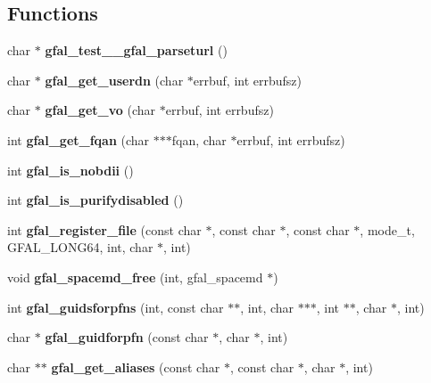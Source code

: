 \subsection*{Functions}
\begin{CompactItemize}
\item 
char $\ast$ \textbf{gfal\_\-test\_\-\_\-gfal\_\-parseturl} ()\label{group__internal__group_g9282bb70dffe20af2db91d05418ac9c5}

\item 
char $\ast$ \textbf{gfal\_\-get\_\-userdn} (char $\ast$errbuf, int errbufsz)\label{group__internal__group_g6bd6336b0fee1ff32ad6bc5ef3d96068}

\item 
char $\ast$ \textbf{gfal\_\-get\_\-vo} (char $\ast$errbuf, int errbufsz)\label{group__internal__group_g1d7294ee456d16c8b1bf40f97ffb5081}

\item 
int \textbf{gfal\_\-get\_\-fqan} (char $\ast$$\ast$$\ast$fqan, char $\ast$errbuf, int errbufsz)\label{group__internal__group_g54b4e29078838583c8022630ef5a2ed3}

\item 
int \textbf{gfal\_\-is\_\-nobdii} ()\label{group__internal__group_g0d2a0557bdb571ccb85c6ab5c05ae56f}

\item 
int \textbf{gfal\_\-is\_\-purifydisabled} ()\label{group__internal__group_g3a35f0e6f616c5108f95cfffd557db77}

\item 
int \textbf{gfal\_\-register\_\-file} (const char $\ast$, const char $\ast$, const char $\ast$, mode\_\-t, GFAL\_\-LONG64, int, char $\ast$, int)\label{group__internal__group_gdb09f20d086253b45c5d2896be95b4a9}

\item 
void \textbf{gfal\_\-spacemd\_\-free} (int, gfal\_\-spacemd $\ast$)\label{group__internal__group_gb22308fb1cfbade81dddfcf4bedf86da}

\item 
int \textbf{gfal\_\-guidsforpfns} (int, const char $\ast$$\ast$, int, char $\ast$$\ast$$\ast$, int $\ast$$\ast$, char $\ast$, int)\label{group__internal__group_g72f2d9fb6a55816f243a4c57c5369fe5}

\item 
char $\ast$ \textbf{gfal\_\-guidforpfn} (const char $\ast$, char $\ast$, int)\label{group__internal__group_g86568afb8c7f9b0d6944de793a3e867a}

\item 
char $\ast$$\ast$ \textbf{gfal\_\-get\_\-aliases} (const char $\ast$, const char $\ast$, char $\ast$, int)\label{group__internal__group_g25d4ae6bef6570590efbc8548e7d79e2}


\end{CompactItemize}
